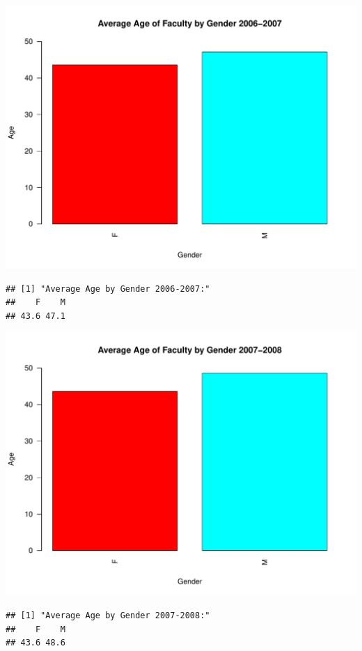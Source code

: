 \documentclass[12pt,a4paper]{article}\usepackage[]{graphicx}\usepackage[]{color}
\makeatletter
\def\maxwidth{ %
  \ifdim\Gin@nat@width>\linewidth
    \linewidth
  \else
    \Gin@nat@width
  \fi
}
\newenvironment{kframe}{%
 \def\at@end@of@kframe{}%
 \ifinner\ifhmode%
  \def\at@end@of@kframe{\end{minipage}}%
  \begin{minipage}{\columnwidth}%
 \fi\fi%
 \def\FrameCommand##1{\hskip\@totalleftmargin \hskip-\fboxsep
 \colorbox{shadecolor}{##1}\hskip-\fboxsep
     \hskip-\linewidth \hskip-\@totalleftmargin \hskip\columnwidth}%
 \MakeFramed {\advance\hsize-\width
   \@totalleftmargin\z@ \linewidth\hsize
   \@setminipage}}%
 {\par\unskip\endMakeFramed%
 \at@end@of@kframe}
\newenvironment{knitrout}{}{} %
\theoremstyle{definition}
\makeatother
\begin{document}
\begin{knitrout}
\begin{kframe}
\end{kframe}
\includegraphics[width=\maxwidth]{figure/unnamed-chunk-11-3} 
\begin{kframe}\begin{verbatim}
## [1] "Average Age by Gender 2006-2007:"
##    F    M 
## 43.6 47.1
\end{verbatim}
\end{kframe}
\includegraphics[width=\maxwidth]{figure/unnamed-chunk-11-4} 
\begin{kframe}\begin{verbatim}
## [1] "Average Age by Gender 2007-2008:"
##    F    M 
## 43.6 48.6
\end{verbatim}
\end{kframe}

\end{knitrout}
\end{document}
